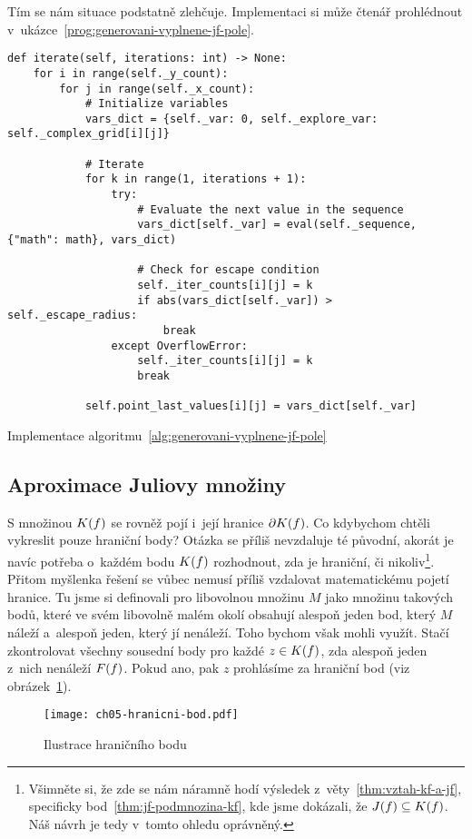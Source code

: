 Tím se nám situace podstatně zlehčuje. Implementaci si může čtenář prohlédnout v~ukázce~\ref{prog:generovani-vyplnene-jf-pole}.
\begin{program}[h]
\begin{lstlisting}[style=python]
def iterate(self, iterations: int) -> None:
    for i in range(self._y_count):
        for j in range(self._x_count):
            # Initialize variables
            vars_dict = {self._var: 0, self._explore_var: self._complex_grid[i][j]}

            # Iterate
            for k in range(1, iterations + 1):
                try:
                    # Evaluate the next value in the sequence
                    vars_dict[self._var] = eval(self._sequence, {"math": math}, vars_dict)

                    # Check for escape condition
                    self._iter_counts[i][j] = k
                    if abs(vars_dict[self._var]) > self._escape_radius:
                        break
                except OverflowError:
                    self._iter_counts[i][j] = k
                    break
            
            self.point_last_values[i][j] = vars_dict[self._var]
\end{lstlisting}
    \caption{Implementace algoritmu~\ref{alg:generovani-vyplnene-jf-pole}}
    \label{prog:generovani-vyplnene-jf-pole}
\end{program}

\subsection{Aproximace Juliovy množiny}\label{subsec:aproximace-juliovy-mnoziny}

S množinou $K(f)$ se rovněž pojí i~její hranice $\partial K(f)$. Co kdybychom chtěli vykreslit pouze hraniční body? Otázka se příliš nevzdaluje té původní, akorát je navíc potřeba o~každém bodu $K(f)$ rozhodnout, zda je hraniční, či nikoliv\footnote{Všimněte si, že zde se nám náramně hodí výsledek z~věty~\ref{thm:vztah-kf-a-jf}, specificky bod~\ref{thm:jf-podmnozina-kf}, kde jsme dokázali, že $J(f)\subseteq K(f)$. Náš návrh je tedy v~tomto ohledu oprávněný.}. Přitom myšlenka řešení se vůbec nemusí příliš vzdalovat matematickému pojetí hranice. Tu jsme si definovali pro libovolnou množinu $M$ jako množinu takových bodů, které ve svém libovolně malém okolí obsahují alespoň jeden bod, který $M$ náleží a~alespoň jeden, který jí nenáleží. Toho bychom však mohli využít. Stačí zkontrolovat všechny sousední body pro každé $z\in K(f)$, zda alespoň jeden z~nich nenáleží $F(f)$. Pokud ano, pak $z$ prohlásíme za hraniční bod (viz obrázek~\ref{fig:hranicni-bod}).
\begin{figure}[h]
    \centering
    \texttt{[image: ch05-hranicni-bod.pdf]}
    \caption{Ilustrace hraničního bodu}
    \label{fig:hranicni-bod}
\end{figure}

